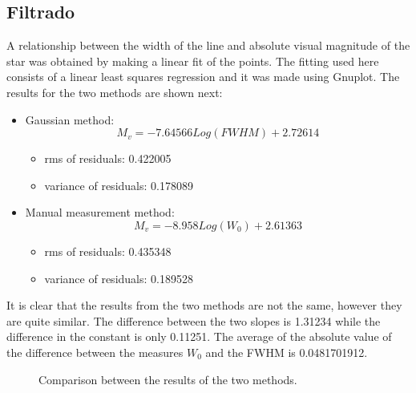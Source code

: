 \documentclass[twocolumn]{AS4201}
\begin{document}
\subsection{Filtrado}
A relationship between the width of the line and absolute visual magnitude of the star was obtained by making a linear fit of the points. The fitting used here consists of a linear least squares regression and it was made using Gnuplot. The results for the two methods are shown next:\\
\begin{itemize}
  \item[\textbullet] Gaussian method:
  \begin{equation}\label{mgauss}
  M_v=-7.64566Log(FWHM)+2.72614
  \end{equation}
  	\begin{itemize}
  	\item rms of residuals:       0.422005
  	\item variance of residuals:  0.178089
  	\end{itemize}
  \item[\textbullet] Manual measurement method:
  \begin{equation}\label{Mman}
  M_v=-8.958Log(W_0)+2.61363
  \end{equation}  
  	\begin{itemize}
  	\item rms of residuals:       0.435348
  	\item variance of residuals:  0.189528
  	\end{itemize}  
\end{itemize}
It is clear that the results from the two methods are not the same, however they are quite similar. The difference between the two slopes is 1.31234 while the difference in the constant is only 0.11251. The average of the absolute value of the difference between the measures $W_0$ and the FWHM is 0.0481701912.\\
\begin{figure}[h!]
	\label{comparacion2}
	\caption{Comparison between the results of the two methods.}
\end{figure}
\end{document}
